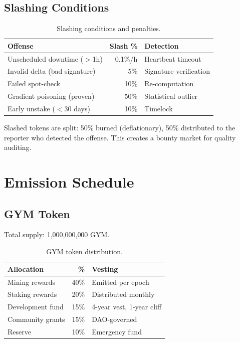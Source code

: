 \documentclass[11pt,letterpaper]{article}
\begin{document}
\subsection{Slashing Conditions}

\begin{table}[t]
\centering
\begin{tabular}{lrl}
\toprule
\textbf{Offense} & \textbf{Slash \%} & \textbf{Detection} \\
\midrule
Unscheduled downtime ($>$1h) & 0.1\%/h & Heartbeat timeout \\
Invalid delta (bad signature) & 5\% & Signature verification \\
Failed spot-check & 10\% & Re-computation \\
Gradient poisoning (proven) & 50\% & Statistical outlier \\
Early unstake ($<$30 days) & 10\% & Timelock \\
\bottomrule
\end{tabular}
\caption{Slashing conditions and penalties.}
\label{tab:slashing}
\end{table}

Slashed tokens are split: 50\% burned (deflationary), 50\% distributed to the reporter who detected the offense.  This creates a bounty market for quality auditing.

\section{Emission Schedule}
\label{sec:emission}

\subsection{GYM Token}

Total supply: 1{,}000{,}000{,}000 GYM.

\begin{table}[t]
\centering
\begin{tabular}{lrl}
\toprule
\textbf{Allocation} & \textbf{\%} & \textbf{Vesting} \\
\midrule
Mining rewards & 40\% & Emitted per epoch \\
Staking rewards & 20\% & Distributed monthly \\
Development fund & 15\% & 4-year vest, 1-year cliff \\
Community grants & 15\% & DAO-governed \\
Reserve & 10\% & Emergency fund \\
\bottomrule
\end{tabular}
\caption{GYM token distribution.}
\label{tab:distribution}
\end{table}
\end{document}
